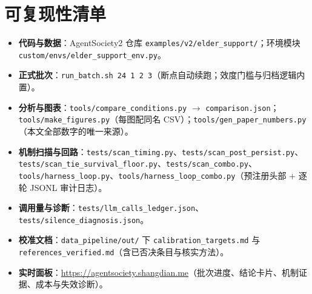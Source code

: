 \documentclass[10.5pt,twocolumn]{ctexart}
\begin{document}
\section{可复现性清单}\label{app:repro}
\begin{itemize}
  \raggedright %
  \item \textbf{代码与数据}：AgentSociety2 仓库 \texttt{examples/v2/elder\_support/}；环境模块 \texttt{custom/envs/elder\_support\_env.py}。
  \item \textbf{正式批次}：\texttt{run\_batch.sh 24 1 2 3}（断点自动续跑；效度门槛与归档逻辑内置）。
  \item \textbf{分析与图表}：\texttt{tools/compare\_conditions.py} $\rightarrow$ \texttt{comparison.json}；\texttt{tools/make\_figures.py}（每图配同名 CSV）；\texttt{tools/gen\_paper\_numbers.py}（本文全部数字的唯一来源）。
  \item \textbf{机制扫描与回路}：\texttt{tests/scan\_timing.py}、\texttt{tests/scan\_post\_persist.py}、\texttt{tests/scan\_tie\_survival\_floor.py}、\texttt{tests/scan\_combo.py}、\texttt{tools/harness\_loop.py}、\texttt{tools/harness\_loop\_combo.py}（预注册头部 + 逐轮 JSONL 审计日志）。
  \item \textbf{调用量与诊断}：\texttt{tests/llm\_calls\_ledger.json}、\texttt{tests/silence\_diagnosis.json}。
  \item \textbf{校准文档}：\texttt{data\_pipeline/out/} 下 \texttt{calibration\_targets.md} 与 \texttt{references\_verified.md}（含已否决条目与核实方法）。
  \item \textbf{实时面板}：\url{https://agentsociety.shangdian.me}（批次进度、结论卡片、机制证据、成本与失效诊断）。
\end{itemize}
\end{document}
